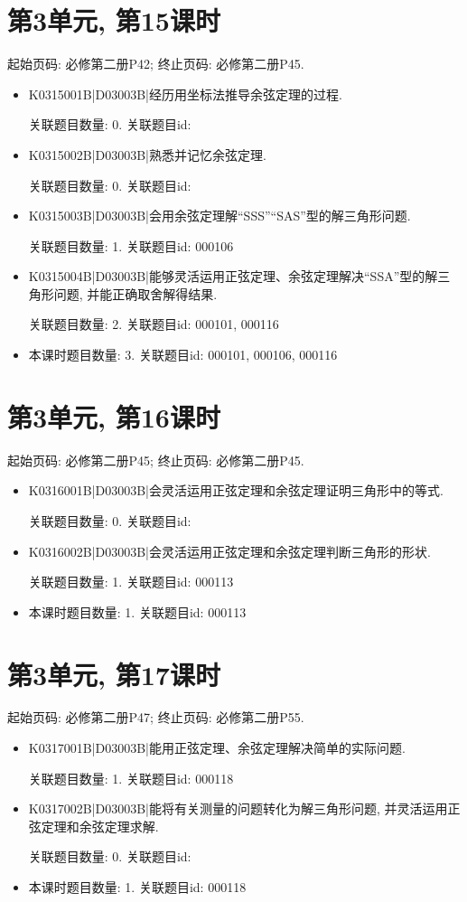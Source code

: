 \section*{第3单元, 第15课时}
起始页码: 必修第二册P42; 终止页码: 必修第二册P45.
\begin{itemize}
\item K0315001B|D03003B|经历用坐标法推导余弦定理的过程.

关联题目数量: 0. 关联题目id: 

\item K0315002B|D03003B|熟悉并记忆余弦定理.

关联题目数量: 0. 关联题目id: 

\item K0315003B|D03003B|会用余弦定理解``SSS''``SAS''型的解三角形问题.

关联题目数量: 1. 关联题目id: 000106

\item K0315004B|D03003B|能够灵活运用正弦定理、余弦定理解决``SSA''型的解三角形问题, 并能正确取舍解得结果.

关联题目数量: 2. 关联题目id: 000101, 000116

\item 本课时题目数量: 3. 关联题目id: 000101, 000106, 000116

\end{itemize}

\section*{第3单元, 第16课时}
起始页码: 必修第二册P45; 终止页码: 必修第二册P45.
\begin{itemize}
\item K0316001B|D03003B|会灵活运用正弦定理和余弦定理证明三角形中的等式.

关联题目数量: 0. 关联题目id: 

\item K0316002B|D03003B|会灵活运用正弦定理和余弦定理判断三角形的形状.

关联题目数量: 1. 关联题目id: 000113

\item 本课时题目数量: 1. 关联题目id: 000113

\end{itemize}

\section*{第3单元, 第17课时}
起始页码: 必修第二册P47; 终止页码: 必修第二册P55.
\begin{itemize}
\item K0317001B|D03003B|能用正弦定理、余弦定理解决简单的实际问题.

关联题目数量: 1. 关联题目id: 000118

\item K0317002B|D03003B|能将有关测量的问题转化为解三角形问题, 并灵活运用正弦定理和余弦定理求解.

关联题目数量: 0. 关联题目id: 

\item 本课时题目数量: 1. 关联题目id: 000118

\end{itemize}

